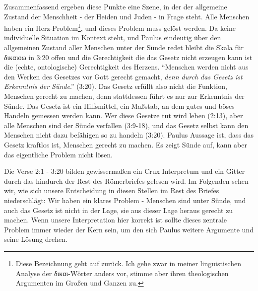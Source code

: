 Zusammenfassend ergeben diese Punkte eine Szene, in der der allgemeine Zustand der Menschheit - der Heiden und Juden - in Frage steht.
Alle Menschen haben ein Herz-Problem\footnote{
	Diese Bezeichnung geht auf \Cite[179]{paul-a-new-covenant-jew} zurück.
	Ich gehe zwar in meiner linguistischen Analyse der δικαι-Wörter anders vor, stimme aber ihren theologischen Argumenten im Großen und Ganzen zu.
}, und dieses Problem muss gelöst werden.
Da keine individuelle Situation im Kontext steht, und Paulus eindeutig über den allgemeinen Zustand aller Menschen unter der Sünde redet
bleibt die Skala für δικαιοω in 3:20 offen und die Gerechtigkeit die das Gesetz nicht erzeugen kann ist die (echte, ontologische) Gerechtigkeit des Herzens.
``Menschen werden nicht aus den Werken des Gesetzes vor Gott gerecht gemacht, \textit{denn durch das Gesetz ist Erkenntnis der Sünde}.'' (3:20).
Das Gesetz erfüllt also nicht die Funktion, Menschen gerecht zu machen, denn stattdessen führt es nur zur Erkenntnis der Sünde.
Das Gesetz ist ein Hilfsmittel, ein Maßstab, an dem gutes und böses Handeln gemessen werden kann.
Wer diese Gesetze tut wird leben (2:13), aber alle Menschen sind der Sünde verfallen (3:9-18),
und das Gesetz selbst kann den Menschen nicht dazu befähigen so zu handeln (3:20).
Paulus Aussage ist, dass das Gesetz kraftlos ist, Menschen gerecht zu machen.
Es zeigt Sünde auf, kann aber das eigentliche Problem nicht lösen.

Die Verse 2:1 - 3:20 bilden gewissermaßen ein Crux Interpretum und ein Gitter durch das hindurch der Rest des Römerbriefes gelesen wird.
Im Folgenden sehen wir, wie sich unsere Entscheidung in diesen Stellen im Rest des Briefes niederschlägt:
Wir haben ein klares Problem - Menschen sind unter Sünde, und auch das Gesetz ist nicht in der Lage, sie aus dieser Lage heraus gerecht zu machen.
Wenn unsere Interpretation hier korrekt ist sollte dieses zentrale Problem immer wieder der Kern sein, um den sich Paulus weitere Argumente und seine Lösung drehen.


